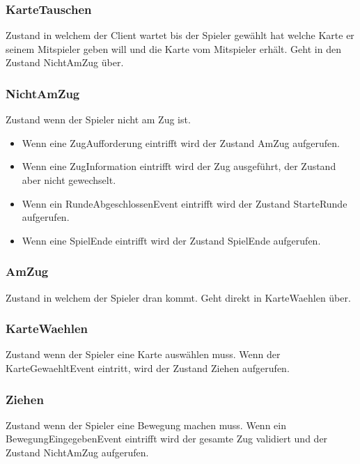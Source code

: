 \documentclass[12pt,halfparskip]{scrartcl}
\begin{document}
\subsubsection{KarteTauschen} %
\label{ssub:kartetauschen}
Zustand in welchem der Client wartet bis der Spieler gewählt hat welche Karte er seinem Mitspieler geben will und die Karte vom Mitspieler erhält. Geht in den Zustand NichtAmZug über.

\subsubsection{NichtAmZug} %
\label{ssub:nichtamzug}
Zustand wenn der Spieler nicht am Zug ist.
\begin{itemize}
	\item Wenn eine ZugAufforderung eintrifft wird der Zustand AmZug aufgerufen.
	\item Wenn eine ZugInformation eintrifft wird der Zug ausgeführt, der Zustand aber nicht gewechselt.
	\item Wenn ein RundeAbgeschlossenEvent eintrifft wird der Zustand StarteRunde aufgerufen.
	\item Wenn eine SpielEnde eintrifft wird der Zustand SpielEnde aufgerufen.
\end{itemize}

\subsubsection{AmZug} %
\label{ssub:amzug}
Zustand in welchem der Spieler dran kommt. Geht direkt in KarteWaehlen über.

\subsubsection{KarteWaehlen} %
\label{ssub:kartewaehlen}
Zustand wenn der Spieler eine Karte auswählen muss. Wenn der KarteGewaehltEvent eintritt, wird der Zustand Ziehen aufgerufen.

\subsubsection{Ziehen} %
\label{ssub:ziehen}
Zustand wenn der Spieler eine Bewegung machen muss. Wenn ein BewegungEingegebenEvent eintrifft wird der gesamte Zug validiert und der Zustand NichtAmZug aufgerufen.
\end{document}
